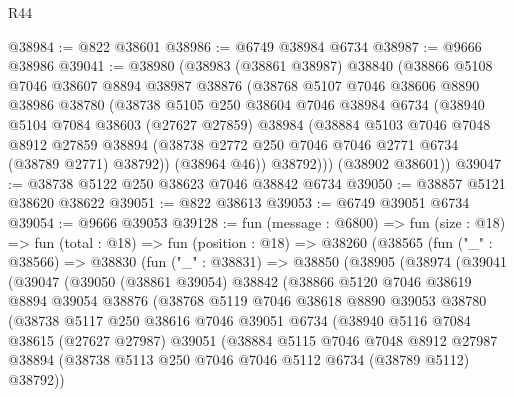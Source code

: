 \begin{lexlean}{R44}
\begin{coremodule}
{@38984 := @822 @38601
@38986 := @6749 @38984 @6734
@38987 := @9666 @38986
@39041 := @38980
    (@38983
      (@38861 @38987)
      @38840
      (@38866
        @5108
        @7046
        @38607
        @8894
        @38987
        @38876
        (@38768
          @5107
          @7046
          @38606
          @8890
          @38986
          @38780
          (@38738
            @5105
            @250
            @38604
            @7046
            @38984
            @6734
            (@38940
              @5104
              @7084
              @38603
              (@27627 @27859)
              @38984
              (@38884
                @5103
                @7046
                @7048
                @8912
                @27859
                @38894
                (@38738 @2772 @250 @7046 @7046 @2771 @6734 (@38789 @2771) @38792))
              (@38964 @46))
            @38792)))
      (@38902 @38601))
@39047 := @38738 @5122 @250 @38623 @7046 @38842 @6734
@39050 := @38857 @5121 @38620 @38622
@39051 := @822 @38613
@39053 := @6749 @39051 @6734
@39054 := @9666 @39053
@39128 := fun (message : @6800) =>
  fun (size : @18) =>
  fun (total : @18) =>
  fun (position : @18) =>
  @38260
    (@38565
      (fun ("_" : @38566) =>
      @38830
        (fun ("_" : @38831) =>
        @38850
          (@38905
            (@38974
              (@39041
                (@39047
                  (@39050
                    (@38861 @39054)
                    @38842
                    (@38866
                      @5120
                      @7046
                      @38619
                      @8894
                      @39054
                      @38876
                      (@38768
                        @5119
                        @7046
                        @38618
                        @8890
                        @39053
                        @38780
                        (@38738
                          @5117
                          @250
                          @38616
                          @7046
                          @39051
                          @6734
                          (@38940
                            @5116
                            @7084
                            @38615
                            (@27627 @27987)
                            @39051
                            (@38884
                              @5115
                              @7046
                              @7048
                              @8912
                              @27987
                              @38894
                              (@38738 @5113 @250 @7046 @7046 @5112 @6734 (@38789 @5112) @38792))
}
\end{coremodule}
\end{lexlean}
